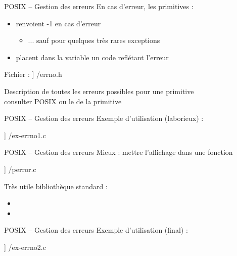\begin {frame} {POSIX -- Gestion des erreurs}
    En cas d'erreur, les primitives :
    \begin {itemize}
	\item renvoient -1 en cas d'erreur
	    \begin {itemize}
		\item ... sauf pour quelques très rares exceptions
	    \end {itemize}

	\item placent dans la variable  un code reflétant l'erreur

    \end {itemize}

    \vspace* {3mm}

    Fichier  :
    \fD\lstmonstyle] {\inc/errno.h}

    \vspace* {3mm}

    Description de toutes les erreurs possibles pour une primitive \\
    \implique consulter POSIX ou le  de la primitive
\end {frame}

\begin {frame} {POSIX -- Gestion des erreurs}
    Exemple d'utilisation (laborieux) :

    \fD\lstmonstyle] {\inc/ex-errno1.c}
\end {frame}

\begin {frame} {POSIX -- Gestion des erreurs}
    Mieux : mettre l'affichage dans une fonction

    \fD\lstmonstyle] {\inc/perror.c}

    Très utile \implique bibliothèque standard :
    \begin {itemize}
	\item {}
	\item {}
    \end {itemize}
\end {frame}

\begin {frame} {POSIX -- Gestion des erreurs}
    Exemple d'utilisation (final) :

    \fD\lstmonstyle] {\inc/ex-errno2.c}
\end {frame}

